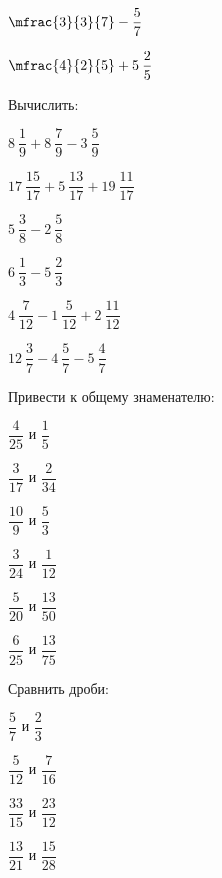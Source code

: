 \begin{listofex}
\begin{enumcols}[itemcolumns=4]
		\item \( \mfrac{3}{3}{7}-\dfrac{5}{7} \)
		\item \( \mfrac{4}{2}{5}+5\:\dfrac{2}{5} \)
	\end{enumcols}
	\item Вычислить:
	\begin{enumcols}[itemcolumns=3]
		\item \( 8\:\dfrac{1}{9}+8\:\dfrac{7}{9}-3\:\dfrac{5}{9} \)
		\item \( 17\:\dfrac{15}{17}+5\:\dfrac{13}{17}+19\:\dfrac{11}{17} \)
		\item \( 5\:\dfrac{3}{8}-2\:\dfrac{5}{8} \)
		\item \( 6\:\dfrac{1}{3}-5\:\dfrac{2}{3} \)
		\item \( 4\:\dfrac{7}{12}-1\:\dfrac{5}{12}+2\:\dfrac{11}{12} \)
		\item \( 12\:\dfrac{3}{7}-4\:\dfrac{5}{7}-5\:\dfrac{4}{7} \)
	\end{enumcols}
	\item Привести к общему знаменателю:
	\begin{enumcols}[itemcolumns=3]
		\item \( \dfrac{4}{25} \) и \( \dfrac{1}{5} \)
		\item \( \dfrac{3}{17} \) и \( \dfrac{2}{34} \)
		\item \( \dfrac{10}{9} \) и \( \dfrac{5}{3} \)
		\item \( \dfrac{3}{24} \) и \( \dfrac{1}{12} \)
		\item \( \dfrac{5}{20} \) и \( \dfrac{13}{50} \)
		\item \( \dfrac{6}{25} \) и \( \dfrac{13}{75} \)
	\end{enumcols}
	\item Сравнить дроби:
	\begin{enumcols}[itemcolumns=4]
		\item \( \dfrac{5}{7} \) и \( \dfrac{2}{3} \)
		\item \( \dfrac{5}{12} \) и \( \dfrac{7}{16} \)
		\item \( \dfrac{33}{15} \) и \( \dfrac{23}{12} \)
		\item \( \dfrac{13}{21} \) и \( \dfrac{15}{28} \)
	\end{enumcols}
\end{listofex}
\newpage
{}
